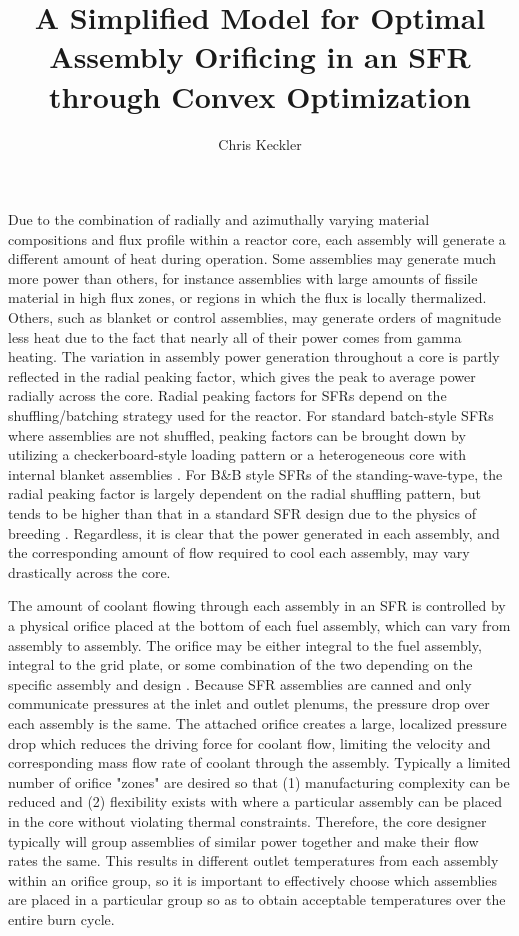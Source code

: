 \documentclass[11pt, oneside]{article}   	%
\title{A Simplified Model for Optimal Assembly Orificing in an SFR through Convex Optimization}
\author{Chris Keckler}
\begin{document}
\maketitle

Due to the combination of radially and azimuthally varying material compositions and flux profile within a reactor core, each assembly will generate a different amount of heat during operation.
Some assemblies may generate much more power than others, for instance assemblies with large amounts of fissile material in high flux zones, or regions in which the flux is locally thermalized.
Others, such as blanket or control assemblies, may generate orders of magnitude less heat due to the fact that nearly all of their power comes from gamma heating.
The variation in assembly power generation throughout a core is partly reflected in the radial peaking factor, which gives the peak to average power radially across the core. 
Radial peaking factors for SFRs depend on the shuffling/batching strategy used for the reactor.
For standard batch-style SFRs where assemblies are not shuffled, peaking factors can be brought down by utilizing a checkerboard-style loading pattern or a heterogeneous core with internal blanket assemblies \cite{}. 
For B\&B style SFRs of the standing-wave-type, the radial peaking factor is largely dependent on the radial shuffling pattern, but tends to be higher than that in a standard SFR design due to the physics of breeding \cite{}.
Regardless, it is clear that the power generated in each assembly, and the corresponding amount of flow required to cool each assembly, may vary drastically across the core.

The amount of coolant flowing through each assembly in an SFR is controlled by a physical orifice placed at the bottom of each fuel assembly, which can vary from assembly to assembly.
The orifice may be either integral to the fuel assembly, integral to the grid plate, or some combination of the two depending on the specific assembly and design \cite{waltar}.
Because SFR assemblies are canned and only communicate pressures at the inlet and outlet plenums, the pressure drop over each assembly is the same.
The attached orifice creates a large, localized pressure drop which reduces the driving force for coolant flow, limiting the velocity and corresponding mass flow rate of coolant through the assembly.
Typically a limited number of orifice "zones" are desired so that (1) manufacturing complexity can be reduced and (2) flexibility exists with where a particular assembly can be placed in the core without violating thermal constraints.
Therefore, the core designer typically will group assemblies of similar power together and make their flow rates the same.
This results in different outlet temperatures from each assembly within an orifice group, so it is important to effectively choose which assemblies are placed in a particular group so as to obtain acceptable temperatures over the entire burn cycle.
\end{document}
